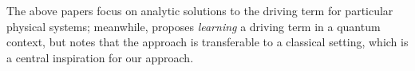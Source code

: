 \documentclass{article}
\begin{document}
The above papers focus on analytic solutions to the driving term for particular physical systems; meanwhile, \cite{sels2017minimizing} proposes \emph{learning} a driving term in a quantum context, but notes that the approach is transferable to a classical setting, which is a central inspiration for our approach.


















\end{document}
